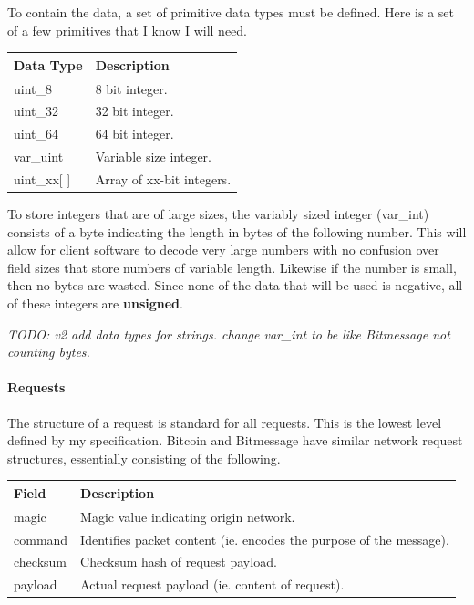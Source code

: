 \documentclass{article}
\begin{document}
To contain the data, a set of primitive data types must be defined. Here is a set of a few primitives that I know I will need.
\begin{table}[h]
\centering
\begin{tabular}{|l|p{8.5cm}|}
\hline
\rowcolor{tblgrey} 
Data Type  & Description            \\ \hline
uint\_8     & 8 bit integer.         \\ \hline
uint\_32    & 32 bit integer.        \\ \hline
uint\_64    & 64 bit integer.        \\ \hline
var\_uint   & Variable size integer. \\ \hline
uint\_xx[ ] & Array of xx-bit integers.\\ \hline
\end{tabular}
\end{table}

To store integers that are of large sizes, the variably sized integer (var\_int) consists of a byte indicating the length in bytes of the following number. This will allow for client software to decode very large numbers with no confusion over field sizes that store numbers of variable length. Likewise if the number is small, then no bytes are wasted. Since none of the data that will be used is negative, all of these integers are \textbf{unsigned}.


\textit{TODO: v2 add data types for strings. change var\_int to be like Bitmessage not counting bytes.}

\paragraph{Requests}
The structure of a request is standard for all requests. This is the lowest level defined by my specification. Bitcoin and Bitmessage have similar network request structures, essentially consisting of the following.
\begin{table}[h]
\centering
\begin{tabular}{|l|p{8.5cm}|}
\hline
\rowcolor{tblgrey} 
Field       & Description                                      \\ \hline
magic       & Magic value indicating origin network.           \\ \hline
command     & Identifies packet content (ie. encodes the purpose of the message). \\ \hline
checksum    & Checksum hash of request payload.                \\ \hline
payload     & Actual request payload (ie. content of request). \\ \hline
\end{tabular}
\end{table}
\end{document}

